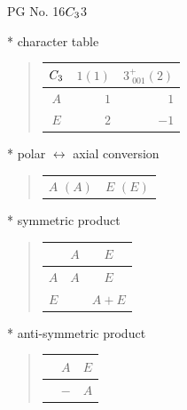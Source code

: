 \documentclass[fleqn,8pt,landscape]{jsarticle}
\begin{document}
\setcounter{MaxMatrixCols}{32}

\renewcommand{\tablename}{Table~}
\renewcommand{\figurename}{Figure~}
\begin{center}
\LARGE
PG No. 16\quad$C_{\rm 3}$\quad$3$\quad[ trigonal ]
\end{center}

* character table
\begin{quote}
\begin{tabular}{crr} \hline \hline
$ C_{\rm 3} $ & $ 1(1) $ & $ 3^{+}_{\,\,001}(2) $ \\ \hline
$ A $ & $ 1 $ & $ 1 $ \\
$ E $ & $ 2 $ & $ -1 $ \\
 \hline \hline
\end{tabular}
\end{quote}

* polar $\leftrightarrow$ axial conversion
\begin{quote}
\begin{tabular}{cc}
$ A\,\,(A) $ & $ E\,\,(E) $
\end{tabular}
\end{quote}

* symmetric product
\begin{quote}
\begin{tabular}{c|cc} \hline \hline
 & $ A $ & $ E $ \\ \hline
$ A $ & $ A $ & $ E $ \\
$ E $ & $  $ & $ A + E $ \\
 \hline \hline
\end{tabular}
\end{quote}

* anti-symmetric product
\begin{quote}
\begin{tabular}{ccc} \hline \hline
 & $ A $ & $ E $ \\ \hline
$  $ & $ - $ & $ A $ \\
 \hline \hline
\end{tabular}
\end{quote}
\end{document}
